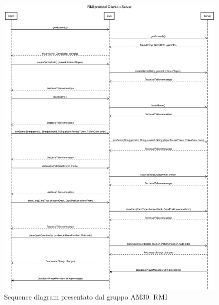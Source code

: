 \documentclass[12pt]{article}
\begin{document}
\begin{figure}[H]
    \begin{center}
        \includegraphics[scale=0.29]{AM30_RMIprotocol.png}
        \caption{Sequence diagram presentato dal gruppo AM30: RMI}
    \end{center}
\end{figure}
\end{document}
